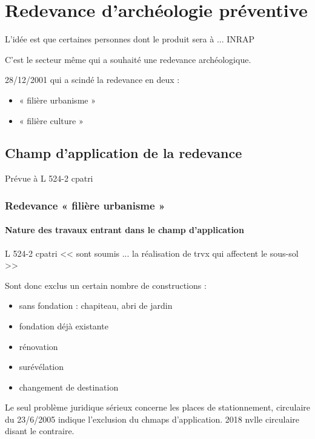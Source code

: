 
\chapter{Redevance d'archéologie préventive}

L'idée est que certaines personnes dont le produit sera à ... INRAP

C'est le secteur même qui a souhaité une redevance archéologique.

28/12/2001 qui a scindé la redevance en deux :
\begin{itemize}
  \item « filière urbanisme »
  \item « filière culture »
\end{itemize}

\section{Champ d'application de la redevance}

  Prévue à L 524-2 cpatri

  \subsection{Redevance « filière urbanisme »}

    \subsubsection{Nature des travaux entrant dans le champ d’application}

      L 524-2 cpatri << sont soumis ... la réalisation de trvx qui affectent le sous-sol >>

      Sont donc exclus un certain nombre de constructions :
      \begin{itemize}
        \item sans fondation : chapiteau, abri de jardin
        \item fondation déjà existante
        \item rénovation
        \item surévélation
        \item changement de destination
      \end{itemize}
      Le seul problème juridique sérieux concerne les places de stationnement, circulaire du 23/6/2005 indique l'exclusion du chmaps d'application. 2018 nvlle circulaire disant le contraire.

